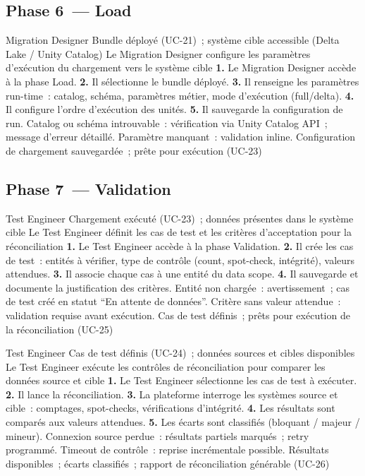 \subsection*{Phase 6~--- Load}

  {Migration Designer}
  {Bundle déployé (UC-21)~; système cible accessible (Delta Lake / Unity Catalog)}
  {Le Migration Designer configure les paramètres d'exécution du chargement vers le système cible}
  {\textbf{1.} Le Migration Designer accède à la phase Load. \textbf{2.} Il sélectionne le bundle déployé. \textbf{3.} Il renseigne les paramètres run-time~: catalog, schéma, paramètres métier, mode d'exécution (full/delta). \textbf{4.} Il configure l'ordre d'exécution des unités. \textbf{5.} Il sauvegarde la configuration de run.}
  {Catalog ou schéma introuvable~: vérification via Unity Catalog API~; message d'erreur détaillé. Paramètre manquant~: validation inline.}
  {Configuration de chargement sauvegardée~; prête pour exécution (UC-23)}

\subsection*{Phase 7~--- Validation}

  {Test Engineer}
  {Chargement exécuté (UC-23)~; données présentes dans le système cible}
  {Le Test Engineer définit les cas de test et les critères d'acceptation pour la réconciliation}
  {\textbf{1.} Le Test Engineer accède à la phase Validation. \textbf{2.} Il crée les cas de test~: entités à vérifier, type de contrôle (count, spot-check, intégrité), valeurs attendues. \textbf{3.} Il associe chaque cas à une entité du data scope. \textbf{4.} Il sauvegarde et documente la justification des critères.}
  {Entité non chargée~: avertissement~; cas de test créé en statut ``En attente de données''. Critère sans valeur attendue~: validation requise avant exécution.}
  {Cas de test définis~; prêts pour exécution de la réconciliation (UC-25)}

  {Test Engineer}
  {Cas de test définis (UC-24)~; données sources et cibles disponibles}
  {Le Test Engineer exécute les contrôles de réconciliation pour comparer les données source et cible}
  {\textbf{1.} Le Test Engineer sélectionne les cas de test à exécuter. \textbf{2.} Il lance la réconciliation. \textbf{3.} La plateforme interroge les systèmes source et cible~: comptages, spot-checks, vérifications d'intégrité. \textbf{4.} Les résultats sont comparés aux valeurs attendues. \textbf{5.} Les écarts sont classifiés (bloquant / majeur / mineur).}
  {Connexion source perdue~: résultats partiels marqués~; retry programmé. Timeout de contrôle~: reprise incrémentale possible.}
  {Résultats disponibles~; écarts classifiés~; rapport de réconciliation générable (UC-26)}

